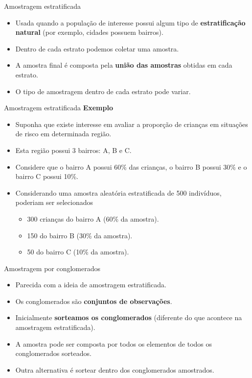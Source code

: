 \documentclass[
  ignorenonframetext,
  serif,
  professionalfont,
  usenames,
  dvipsnames,
  aspectratio = 169]{beamer}
\providecommand{\tightlist}{%
  \setlength{\itemsep}{0pt}\setlength{\parskip}{0pt}}
\renewcommand{\tightlist}{%
  \setlength{\itemsep}{0\baselineskip}
  \setlength{\parskip}{0.25\baselineskip}
}
\begin{document}
\begin{frame}{Amostragem estratificada}
\protect\hypertarget{amostragem-estratificada}{}
\begin{itemize}
\item
  Usada quando a população de interesse possui algum tipo de
  \textbf{estratificação natural} (por exemplo, cidades possuem
  bairros).
\item
  Dentro de cada estrato podemos coletar uma amostra.
\item
  A amostra final é composta pela \textbf{união das amostras} obtidas em
  cada estrato.
\item
  O tipo de amostragem dentro de cada estrato pode variar.
\end{itemize}
\end{frame}

\begin{frame}{Amostragem estratificada}
\protect\hypertarget{amostragem-estratificada-1}{}
\textbf{Exemplo}

\begin{itemize}
\item
  Suponha que existe interesse em avaliar a proporção de crianças em
  situações de risco em determinada região.
\item
  Esta região possui 3 bairros: A, B e C.
\item
  Considere que o bairro A possui 60\% das crianças, o bairro B possui
  30\% e o bairro C possui 10\%.
\item
  Considerando uma amostra aleatória estratificada de 500 indivíduos,
  poderiam ser selecionados

  \begin{itemize}
  \tightlist
  \item
    300 crianças do bairro A (60\% da amostra).
  \item
    150 do bairro B (30\% da amostra).
  \item
    50 do bairro C (10\% da amostra).
  \end{itemize}
\end{itemize}
\end{frame}

\begin{frame}{Amostragem por conglomerados}
\protect\hypertarget{amostragem-por-conglomerados}{}
\begin{itemize}
\item
  Parecida com a ideia de amostragem estratificada.
\item
  Os conglomerados são \textbf{conjuntos de observações}.
\item
  Inicialmente \textbf{sorteamos os conglomerados} (diferente do que
  acontece na amostragem estratificada).
\item
  A amostra pode ser composta por todos os elementos de todos os
  conglomerados sorteados.
\item
  Outra alternativa é sortear dentro dos conglomerados amostrados.
\end{itemize}
\end{frame}
\end{document}
